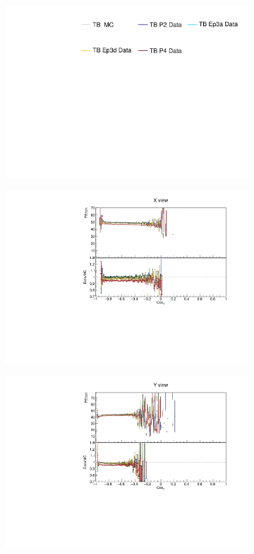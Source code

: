 \begin{figure}[!ht]
  \begin{subfigure}{\textwidth}
  \centering
    \includegraphics[height=0.2\linewidth]{essentialsec_tb/legend.pdf}
  \end{subfigure}
  \vspace*{2mm}
  
  \begin{subfigure}{0.495\textwidth}
    \includegraphics[width=\linewidth]{PlotsAngularDistribution/pecm_cosy_x.pdf}
  \end{subfigure}
  \begin{subfigure}{0.495\textwidth}
    \includegraphics[width=\linewidth]{PlotsAngularDistribution/pecm_cosy_y.pdf}

\end{subfigure}
\end{figure}

